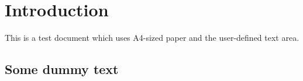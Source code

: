 \documentclass{article}
\begin{document}
	\section{Introduction}
	This is a test document which uses A4-sized paper and the user-defined text area. 
	\subsection{Some dummy text}
	\blindtext[8]
	
\end{document}
